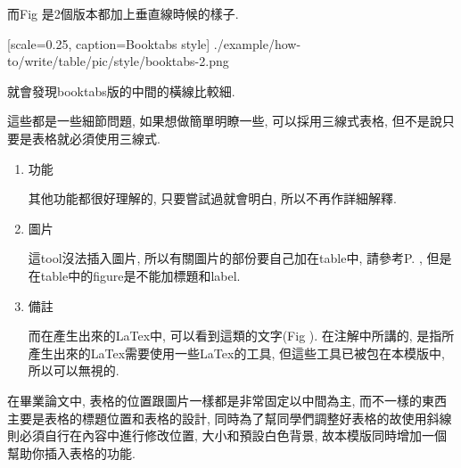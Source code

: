   而Fig 是2個版本都加上垂直線時候的樣子.

    {
      [scale=0.25,
      caption={Booktabs style}]
      {./example/how-to/write/table/pic/style/booktabs-2.png}
    }

  就會發現booktabs版的中間的橫線比較細.

  這些都是一些細節問題, 如果想做簡單明瞭一些, 可以採用三線式表格, 但不是說只要是表格就必須使用三線式.

{}

  \begin{enumerate}

  \item
  {
    功能

    其他功能都很好理解的, 只要嘗試過就會明白, 所以不再作詳細解釋.
  } %

  \item
  {
    圖片

    這tool沒法插入圖片, 所以有關圖片的部份要自己加在table中, 請參考P. , 但是在table中的figure是不能加標題和label.
  } %

  \item
  {
    備註

    而在產生出來的LaTex中, 可以看到這類的文字(Fig ). 在注解中所講的, 是指所產生出來的LaTex需要使用一些LaTex的工具, 但這些工具已被包在本模版中, 所以可以無視的.

  } %
  \end{enumerate}

\newpage
{}

在畢業論文中, 表格的位置跟圖片一樣都是非常固定以中間為主, 而不一樣的東西主要是表格的標題位置和表格的設計, 同時為了幫同學們調整好表格的故使用斜線則必須自行在內容中進行修改位置, 大小和預設白色背景, 故本模版同時增加一個幫助你插入表格的功能.

